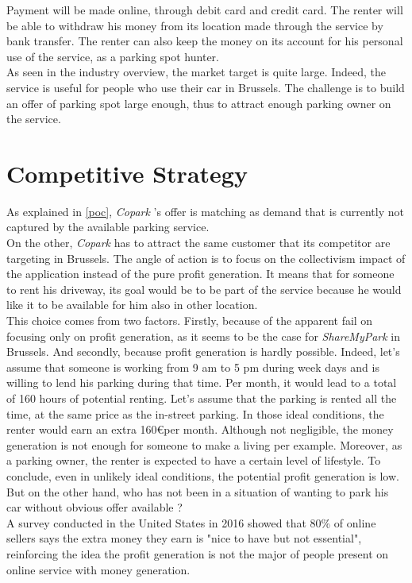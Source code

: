 \documentclass[12pt,a4paper,oneside]{book}
\newcommand{\bp}{\textit{Copark }}
\begin{document}
Payment will be made online, through debit card and credit card. The renter will be able to withdraw his money from its location made through the service by bank transfer. The renter can also keep the money on its account for his personal use of the service, as a parking spot hunter.\\

As seen in the industry overview, the market target is quite large. Indeed, the service is useful for people who use their car in Brussels. The challenge is to build an offer of parking spot large enough, thus to attract enough parking owner on the service.

\section{Competitive Strategy}
\label{cst}
As explained in \autoref{poc}, \bp's offer is matching as demand that is currently not captured by the available parking service.\\

On the other, \bp has to attract the same customer that its competitor are targeting in Brussels. The angle of action is to focus on the collectivism impact of the application instead of the pure profit generation. It means that for someone to rent his driveway, its goal would be to be part of the service because he would like it to be available for him also in other location.\\
This choice comes from two factors. Firstly, because of the apparent fail on focusing only on profit generation, as it seems to be the case for \textit{ShareMyPark} in Brussels. And secondly, because profit generation is hardly possible. Indeed, let's assume that someone is working from 9 am to 5 pm during week days and is willing to lend his parking during that time. Per month, it would lead to a total of 160 hours of potential renting. Let's assume that the parking is rented all the time, at the same price as the in-street parking. In those ideal conditions, the renter would earn an extra 160\euro  per month. Although not negligible, the money generation is not enough for someone to make a living per example. Moreover, as a parking owner, the renter is expected to have a certain level of lifestyle. To conclude, even in unlikely ideal conditions, the potential profit generation is low. But on the other hand, who has not been in a situation of wanting to park his car without obvious offer available ?\\
A survey conducted in the United States in 2016 showed that 80\% of online sellers says the extra money they earn is "nice to have but not essential"\cite{ospg}, reinforcing the idea the profit generation is not the major of people present on online service with money generation.
\end{document}
